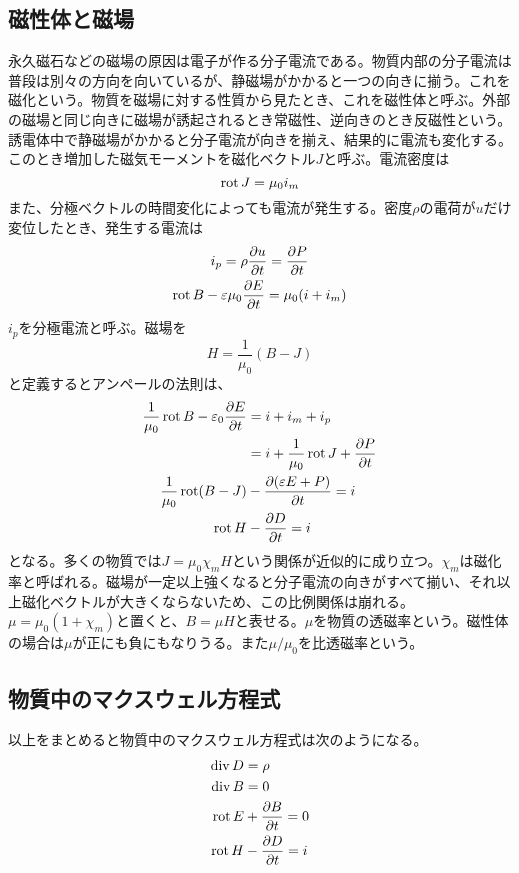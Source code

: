 \subsection{磁性体と磁場}
    永久磁石などの磁場の原因は電子が作る分子電流である。物質内部の分子電流は普段は別々の方向を向いているが、静磁場がかかると一つの向きに揃う。これを磁化という。物質を磁場に対する性質から見たとき、これを磁性体と呼ぶ。外部の磁場と同じ向きに磁場が誘起されるとき常磁性、逆向きのとき反磁性という。誘電体中で静磁場がかかると分子電流が向きを揃え、結果的に電流も変化する。このとき増加した磁気モーメントを磁化ベクトル$J$と呼ぶ。電流密度は
        \[\rot J = \mu_0i_m\]
    また、分極ベクトルの時間変化によっても電流が発生する。密度$\rho$の電荷が$u$だけ変位したとき、発生する電流は
    \begin{gather*}
        i_p = \rho\pd[u]{t} = \pd[P]{t}\\
        \rot B - \epsilon\mu_0\pd[E]{t} = \mu_0 (i + i_m)\\
    \end{gather*}
    $i_p$を分極電流と呼ぶ。磁場を
        \[H = \frac{1}{\mu_0}(B - J)\]
    と定義するとアンペールの法則は、
    \begin{align*}
        \frac{1}{\mu_0}\rot B - \epsilon_0 \pd[E]{t}
        &= i + i_m + i_p\\
        &= i + \frac{1}{\mu_0}\rot J + \pd[P]{t}\\
        \frac{1}{\mu_0}\rot(B - J) &- \pd[(\epsilon E + P)]{t} = i\\
        \rot H &- \pd[D]{t} = i\\
    \end{align*}
    となる。多くの物質では$J = \mu_0\chi_m H$という関係が近似的に成り立つ。$\chi_m$は磁化率と呼ばれる。磁場が一定以上強くなると分子電流の向きがすべて揃い、それ以上磁化ベクトルが大きくならないため、この比例関係は崩れる。$\mu = \mu_0(1 + \chi_m)$と置くと、$B = \mu H$と表せる。$\mu$を物質の透磁率という。磁性体の場合は$\mu$が正にも負にもなりうる。また$\mu / \mu_0$を比透磁率という。

\subsection{物質中のマクスウェル方程式}
    以上をまとめると物質中のマクスウェル方程式は次のようになる。
    \begin{align*}
        \div D &= \rho\\
        \div B &= 0\\
        \rot E &+ \pd[B]{t} = 0\\
        \rot H &- \pd[D]{t} =  i\\
    \end{align*}